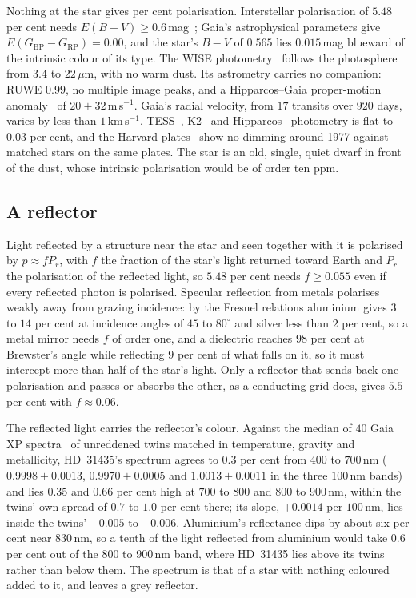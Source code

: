 \documentclass[3p,11pt]{elsarticle}
\newcommand{\um}{\,$\mu$m}
\begin{document}
Nothing at the star gives per cent polarisation. Interstellar polarisation of
$5.48$ per cent needs $E(B-V)\ge0.6$\,mag~\cite{Serkowski1975}; Gaia's astrophysical
parameters give $E(G_\mathrm{BP}-G_\mathrm{RP})=0.00$, and the star's $B-V$ of $0.565$
lies $0.015$\,mag blueward of the intrinsic colour of its type. The WISE
photometry~\cite{Wright2010} follows the photosphere from $3.4$ to $22$\um, with no warm
dust. Its astrometry carries no companion: RUWE $0.99$, no multiple image peaks, and a
Hipparcos--Gaia proper-motion anomaly~\cite{Kervella2022} of $20\pm32$\,m\,s$^{-1}$. Gaia's
radial velocity, from $17$ transits over $920$ days, varies by less than
$1$\,km\,s$^{-1}$. TESS~\cite{Ricker2015},
K2~\cite{Howell2014} and Hipparcos~\cite{Perryman1997} photometry is flat to $0.03$ per
cent, and the Harvard plates~\cite{Grindlay2009} show no dimming around 1977 against
matched stars on the same plates. The star is an old, single, quiet dwarf in front of the
dust, whose intrinsic polarisation would be of order ten ppm.

\subsection{A reflector}

Light reflected by a structure near the star and seen together with it is polarised by
$p\approx fP_r$, with $f$ the fraction of the star's light returned toward Earth and
$P_r$ the polarisation of the reflected light, so $5.48$ per cent needs $f\ge0.055$ even
if every reflected photon is polarised. Specular reflection from metals polarises
weakly away from grazing incidence: by the Fresnel relations aluminium gives $3$ to $14$
per cent at incidence angles of $45$ to $80^\circ$ and silver less than $2$ per cent, so
a metal mirror needs $f$ of order one, and a dielectric reaches $98$ per cent at
Brewster's angle while reflecting $9$ per cent of what falls on it, so it must
intercept more than half of the star's light. Only a reflector that sends back one
polarisation and passes or absorbs the other, as a conducting grid does, gives
$5.5$ per cent with $f\approx0.06$.

The reflected light carries the reflector's colour. Against the median of $40$ Gaia XP
spectra~\cite{DeAngeli2023} of unreddened twins matched in temperature, gravity and
metallicity, HD~31435's spectrum agrees to $0.3$ per cent from $400$ to $700$\,nm
($0.9998\pm0.0013$, $0.9970\pm0.0005$ and $1.0013\pm0.0011$ in the three $100$\,nm
bands) and lies $0.35$ and $0.66$ per cent high at $700$ to $800$ and $800$ to $900$\,nm,
within the twins' own spread of $0.7$ to $1.0$ per cent there; its slope,
$+0.0014$ per $100$\,nm, lies inside the twins' $-0.005$ to $+0.006$. Aluminium's
reflectance dips by about six per cent near $830$\,nm, so a tenth of the light
reflected from aluminium would take $0.6$ per cent out of the $800$ to $900$\,nm band,
where HD~31435 lies above its twins rather than below them. The spectrum is that of a
star with nothing coloured added to it, and leaves a grey reflector.
\end{document}
